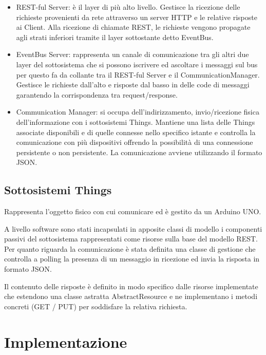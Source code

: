 \documentclass[11pt,a4paper]{article}
\begin{document}
\begin{itemize}

\item REST-ful Server: \`e il layer di pi\`u alto livello.
%
Gestisce la ricezione delle richieste provenienti da rete attraverso un server HTTP e le relative risposte ai Client.
%
Alla ricezione di chiamate REST, le richieste vengono propagate agli strati inferiori tramite il layer sottostante detto EventBus.

\item EventBus Server: rappresenta un canale di comunicazione tra gli altri due layer del sottosistema che si possono iscrivere ed ascoltare i messaggi sul bus per questo fa da collante tra il REST-ful Server e il CommunicationManager.
%
Gestisce le richieste dall'alto e risposte dal basso in delle code di messaggi garantendo la corrispondenza tra request/response. 

\item Communication Manager: si occupa dell'indirizzamento, invio/ricezione fisica dell'informazione con i sottosistemi Things.
%
Mantiene una lista delle Things associate disponibili e di quelle connesse nello specifico istante e controlla la comunicazione con pi\`u dispositivi offrendo la possibilit\`a di una connessione persistente o non persistente.
%
La comunicazione avviene utilizzando il formato JSON.

\end{itemize}

\subsection{Sottosistemi Things}

Rappresenta l'oggetto fisico con cui comunicare ed \`e gestito da un Arduino UNO.

A livello software sono stati incapsulati in apposite classi di modello i componenti passivi del sottosistema rappresentati come risorse sulla base del modello REST.
%
Per quanto riguarda la comunicazione \`e stata definita una classe di gestione che controlla a polling la presenza di un messaggio in ricezione ed invia la risposta in formato JSON.

Il contenuto delle risposte  \`e definito in modo specifico dalle risorse implementate che estendono una classe astratta AbstractResource e ne implementano i metodi concreti (GET / PUT) per soddisfare la relativa richiesta.

\section{Implementazione}
\end{document}
